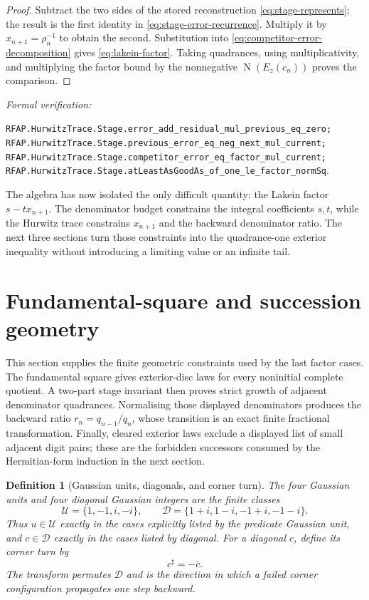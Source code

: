 \documentclass[11pt]{article}
\newtheorem{definition}[definition]{Definition}
\newcommand{\Norm}[1]{\operatorname{N}\!\left(#1\right)}
\newcommand{\leanref}[1]{\par\smallskip\noindent
  \emph{Formal verification:}\par\nobreak
  {\raggedright\nolinkurl{#1}.\par}}
\begin{document}
\begin{proof}
Subtract the two sides of the stored reconstruction
\eqref{eq:stage-represents}; the result is the first identity in
\eqref{eq:stage-error-recurrence}.  Multiply it by
$x_{n+1}=\rho_n^{-1}$ to obtain the second.  Substitution into
\eqref{eq:competitor-error-decomposition} gives
\eqref{eq:lakein-factor}.  Taking quadrances, using multiplicativity, and
multiplying the factor bound by the nonnegative $\Norm{E_z(c_n)}$ proves the
comparison.
\end{proof}

\leanref{RFAP.HurwitzTrace.Stage.error_add_residual_mul_previous_eq_zero;
RFAP.HurwitzTrace.Stage.previous_error_eq_neg_next_mul_current;
RFAP.HurwitzTrace.Stage.competitor_error_eq_factor_mul_current;
RFAP.HurwitzTrace.Stage.atLeastAsGoodAs_of_one_le_factor_normSq}

The algebra has now isolated the only difficult quantity: the Lakein factor
$s-tx_{n+1}$.  The denominator budget constrains the integral coefficients
$s,t$, while the Hurwitz trace constrains $x_{n+1}$ and the backward
denominator ratio.  The next three sections turn those constraints into the
quadrance-one exterior inequality without introducing a limiting value or an
infinite tail.

\section{Fundamental-square and succession geometry}
\label{sec:succession-geometry}

This section supplies the finite geometric constraints used by the last
factor cases.  The fundamental square gives exterior-disc laws for every
noninitial complete quotient.  A two-part stage invariant then proves strict
growth of adjacent denominator quadrances.  Normalising those displayed
denominators produces the backward ratio $r_n=q_{n-1}/q_n$, whose transition
is an exact finite fractional transformation.  Finally, cleared exterior
laws exclude a displayed list of small adjacent digit pairs; these are the
forbidden successors consumed by the Hermitian-form induction in the next
section.

\begin{definition}[Gaussian units, diagonals, and corner turn]
\label{def:small-gaussian-classes}
The four Gaussian units and four diagonal Gaussian integers are the finite
classes
\[
 \mathcal U=\{1,-1,i,-i\},
 \qquad
 \mathcal D=\{1+i,1-i,-1+i,-1-i\}.
\]
Thus $u\in\mathcal U$ exactly in the cases explicitly listed by the
predicate \emph{Gaussian unit}, and $c\in\mathcal D$ exactly in the cases
listed by \emph{diagonal}.  For a diagonal $c$, define its corner turn by
\[
                              c^\sharp=-\overline c.
\]
The transform permutes $\mathcal D$ and is the direction in which a failed
corner configuration propagates one step backward.
\end{definition}
\end{document}
